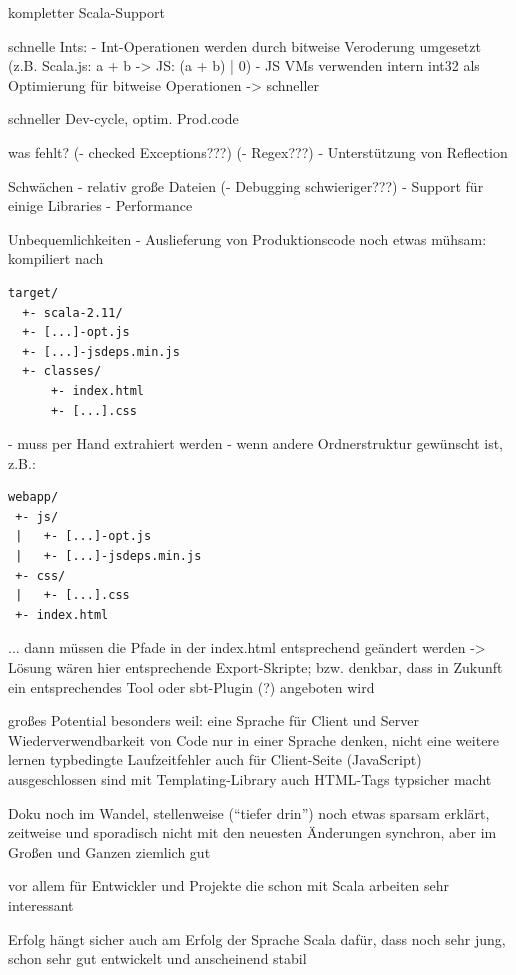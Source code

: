 \documentclass[a4paper, 12pt, hidelinks, listof=totoc, listoftables=totoc, bibliography=totoc]{scrreprt}
\begin{document}
  kompletter Scala-Support
  
  schnelle Ints:
  - Int-Operationen werden durch bitweise Veroderung umgesetzt (z.B. Scala.js: a + b -> JS: (a + b) | 0)
  - JS VMs verwenden intern int32 als Optimierung für bitweise Operationen
  -> schneller\cite{doeraene2015.SSP}


  schneller Dev-cycle, optim. Prod.code
  
  
was fehlt?
  (- checked Exceptions???)
  (- Regex???)
  - Unterstützung von Reflection

Schwächen
  - relativ große Dateien
  (- Debugging schwieriger???)
  - Support für einige Libraries
  - Performance
  
Unbequemlichkeiten
  - Auslieferung von Produktionscode noch etwas mühsam: kompiliert nach
\begin{lstlisting}
target/
  +- scala-2.11/
  +- [...]-opt.js
  +- [...]-jsdeps.min.js
  +- classes/
      +- index.html
      +- [...].css
\end{lstlisting}
  - muss per Hand extrahiert werden
  - wenn andere Ordnerstruktur gewünscht ist, z.B.:
\begin{lstlisting}
webapp/
 +- js/
 |   +- [...]-opt.js
 |   +- [...]-jsdeps.min.js
 +- css/
 |   +- [...].css
 +- index.html
\end{lstlisting}
  ... dann müssen die Pfade in der index.html entsprechend geändert werden
  -> Lösung wären hier entsprechende Export-Skripte; bzw. denkbar, dass in Zukunft ein entsprechendes Tool oder sbt-Plugin (?) angeboten wird



großes Potential
	besonders weil: eine Sprache für Client und Server
		Wiederverwendbarkeit von Code
		nur in einer Sprache denken, nicht eine weitere lernen
	typbedingte Laufzeitfehler auch für Client-Seite (JavaScript) ausgeschlossen sind
	mit Templating-Library auch HTML-Tags typsicher macht
	
Doku noch im Wandel, stellenweise ("`tiefer drin"') noch etwas sparsam erklärt, zeitweise und sporadisch nicht mit den neuesten Änderungen synchron, aber im Großen und Ganzen ziemlich gut

vor allem für Entwickler und Projekte die schon mit Scala arbeiten sehr interessant

Erfolg hängt sicher auch am Erfolg der Sprache Scala
dafür, dass noch sehr jung, schon sehr gut entwickelt und anscheinend stabil
\end{document}
